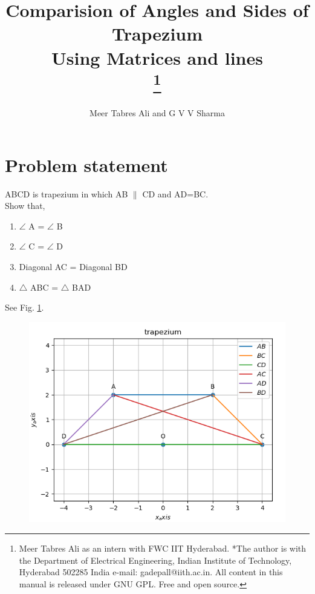 \documentclass[journal,10pt,twocolumn]{article}
\begin{document}

\let\vec\mathbf




\title{
{Comparision of Angles and Sides of Trapezium\\
Using Matrices and lines}\\

\thanks{Meer Tabres Ali as an intern with FWC IIT Hyderabad. *The author is with the Department of Electrical Engineering, Indian Institute of Technology, Hyderabad 502285 India e-mail: gadepall@iith.ac.in. All content in this manual is released under GNU GPL. Free and open source.}
}
\author{Meer Tabres Ali and G V V Sharma}
\maketitle
\tableofcontents
\section{Problem statement}
\fi
ABCD is trapezium in which AB $\parallel$ CD and AD=BC.\\
Show that, \\
\begin{enumerate}
    \item $\angle$ A = $\angle$ B\\
    \item $\angle$ C = $\angle$ D\\
    \item Diagonal AC = Diagonal BD\\
    \item $\triangle$ ABC  = $\triangle$ BAD \\
\end{enumerate}
\solution 
See Fig. 
		\ref{fig:9/8/1/12}.
	\begin{figure}[!h]
		\centering
 \includegraphics[width=\columnwidth]{chapters/9/8/1/12/figs/trapezium1.png}
		\caption{}
		\label{fig:9/8/1/12}
  	\end{figure}
\iffalse
\end{document}
